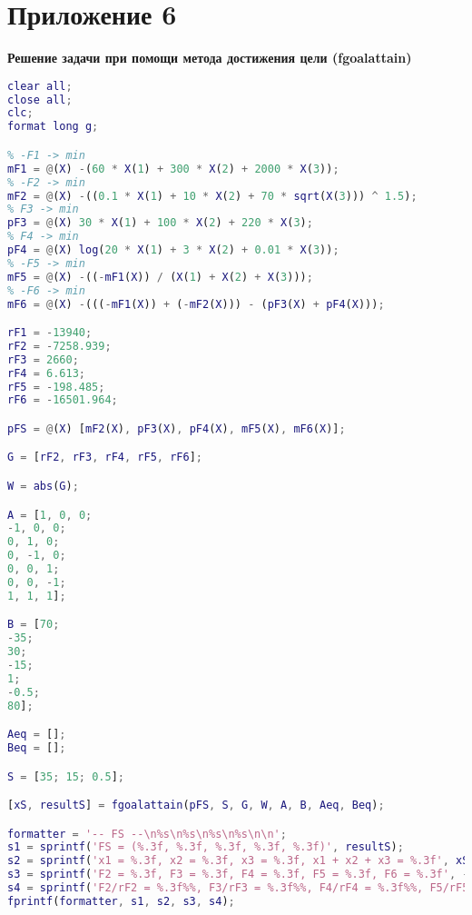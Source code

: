 \section*{Приложение 6} \label{p1:6}
\textbf{Решение задачи при помощи метода достижения цели (fgoalattain)}
\begin{lstlisting}[language={matlab}, caption={Решение задачи при помощи метода достижения цели (fgoalattain)}, label={lst:0}, basicstyle={\footnotesize\ttfamily}, breaklines={true}]
clear all;
close all; 
clc;
format long g;

% -F1 -> min
mF1 = @(X) -(60 * X(1) + 300 * X(2) + 2000 * X(3));
% -F2 -> min
mF2 = @(X) -((0.1 * X(1) + 10 * X(2) + 70 * sqrt(X(3))) ^ 1.5);
% F3 -> min
pF3 = @(X) 30 * X(1) + 100 * X(2) + 220 * X(3);
% F4 -> min
pF4 = @(X) log(20 * X(1) + 3 * X(2) + 0.01 * X(3));
% -F5 -> min
mF5 = @(X) -((-mF1(X)) / (X(1) + X(2) + X(3)));
% -F6 -> min
mF6 = @(X) -(((-mF1(X)) + (-mF2(X))) - (pF3(X) + pF4(X)));

rF1 = -13940;
rF2 = -7258.939;
rF3 = 2660;
rF4 = 6.613;
rF5 = -198.485;
rF6 = -16501.964;

pFS = @(X) [mF2(X), pF3(X), pF4(X), mF5(X), mF6(X)];

G = [rF2, rF3, rF4, rF5, rF6];

W = abs(G);

A = [1, 0, 0;
-1, 0, 0;
0, 1, 0;
0, -1, 0;
0, 0, 1;
0, 0, -1;
1, 1, 1];

B = [70;
-35;
30;
-15;
1;
-0.5;
80];

Aeq = [];
Beq = [];

S = [35; 15; 0.5];

[xS, resultS] = fgoalattain(pFS, S, G, W, A, B, Aeq, Beq);

formatter = '-- FS --\n%s\n%s\n%s\n%s\n\n';
s1 = sprintf('FS = (%.3f, %.3f, %.3f, %.3f, %.3f)', resultS);
s2 = sprintf('x1 = %.3f, x2 = %.3f, x3 = %.3f, x1 + x2 + x3 = %.3f', xS, sum(xS));
s3 = sprintf('F2 = %.3f, F3 = %.3f, F4 = %.3f, F5 = %.3f, F6 = %.3f', -mF2(xS), pF3(xS), pF4(xS), -mF5(xS), -mF6(xS));
s4 = sprintf('F2/rF2 = %.3f%%, F3/rF3 = %.3f%%, F4/rF4 = %.3f%%, F5/rF5 = %.3f%%, F6/rF6 = %.3f%%', mF2(xS) / rF2 * 100, pF3(xS) / rF3 * 100, pF4(xS) / rF4 * 100, mF5(xS) / rF5 * 100, mF6(xS) / rF6 * 100);
fprintf(formatter, s1, s2, s3, s4);
\end{lstlisting}

